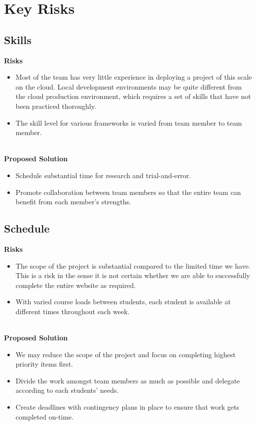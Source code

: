\section{Key Risks}

\subsection{Skills}
\textbf{Risks}
\begin{itemize}
\item Most of the team has very little experience in deploying a project of this scale on the cloud.  Local development environments may be quite different from the cloud production environment, which requires a set of skills that have not been practiced thoroughly.
\item The skill level for various frameworks is varied from team member to team member.
\end{itemize}\hfill\\
\textbf{Proposed Solution}
\begin{itemize}
\item Schedule substantial time for research and trial-and-error.
\item Promote collaboration between team members so that the entire team can benefit from each member's strengths.
\end{itemize}

\subsection{Schedule}
\textbf{Risks}
\begin{itemize}
\item The scope of the project is substantial compared to the limited time we have.\\
This is a risk in the sense it is not certain whether we are able to successfully complete the entire website as required.
\item With varied course loads between students, each student is available at different times throughout each week.
\end{itemize}\hfill\\
\textbf{Proposed Solution}
\begin{itemize}
\item We may reduce the scope of the project and focus on completing highest priority items first.
\item Divide the work amongst team members as much as possible and delegate according to each students' needs.
\item Create deadlines with contingency plans in place to ensure that work gets completed on-time.
\end{itemize}

